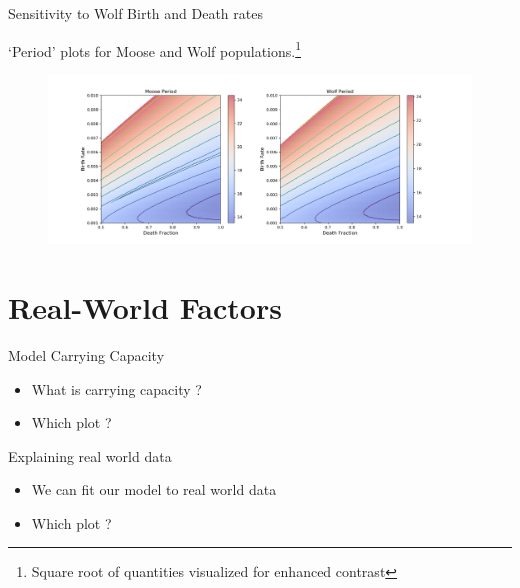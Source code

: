 \documentclass{beamer}
\begin{document}
\begin{frame}{Sensitivity to Wolf Birth and Death rates}
	\item `Period' plots for Moose and Wolf populations.\footnote{Square root of quantities visualized for enhanced contrast}
	\begin{figure}
		\vspace*{-0.25cm}\hspace*{-1.1cm}\includegraphics[scale=0.35]{../plot_notebooks/sqrt_per_vary_W}
	\end{figure}\end{frame}


\section{Real-World Factors}
\begin{frame}{Model Carrying Capacity}
	\begin{itemize}
		\item What is carrying capacity ?
		\item Which plot ?
	\end{itemize}
\end{frame}


\begin{frame}{Explaining real world data}
	\begin{itemize}
		\item We can fit our model to real world data
		\item Which plot ?
	\end{itemize}
\end{frame}
\end{document}
